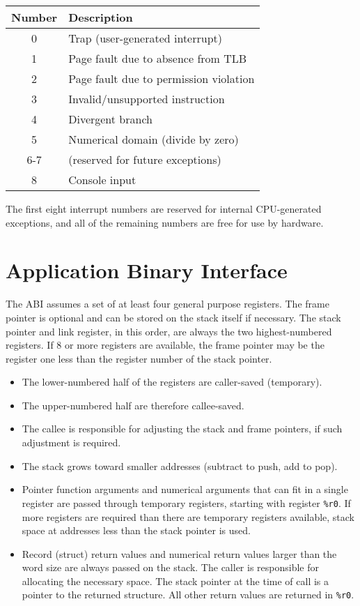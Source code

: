 \documentclass[10pt,letterpaper]{article}
\begin{document}
\begin{center}
\begin{tabular}{cl}
\textbf{Number}&\textbf{Description}\\
\hline
0    &Trap (user-generated interrupt)\\
1    &Page fault due to absence from TLB\\
2    &Page fault due to permission violation\\
3    &Invalid/unsupported instruction\\
4    &Divergent branch\\
5    &Numerical domain (divide by zero)\\
6-7&(reserved for future exceptions)\\
8    &Console input\\
\end{tabular}
\end{center}

The first eight interrupt numbers are reserved for internal CPU-generated exceptions, and all of the remaining numbers are free for use by hardware.

\section{Application Binary Interface}
The ABI assumes a set of at least four general purpose registers.
The frame pointer is optional and can be stored on the stack itself if necessary.
The stack pointer and link register, in this order, are always the two highest-numbered registers.
If 8 or more registers are available, the frame pointer may be the register one less than the register number of the stack pointer.

\begin{itemize}
  \item The lower-numbered half of the registers are caller-saved (temporary).
  \item The upper-numbered half are therefore callee-saved.
  \item The callee is responsible for adjusting the stack and frame pointers, if such adjustment is required.
  \item The stack grows toward smaller addresses (subtract to push, add to pop).
  \item Pointer function arguments and numerical arguments that can fit in a single register are passed through temporary registers, starting with register \texttt{\%r0}. If more registers are required than there are temporary registers available, stack space at addresses less than the stack pointer is used.
  \item Record (struct) return values and numerical return values larger than the word size are always passed on the stack. The caller is responsible for allocating the necessary space. The stack pointer at the time of call is a pointer to the returned structure. All other return values are returned in \texttt{\%r0}.
\end{itemize}
\end{document}
